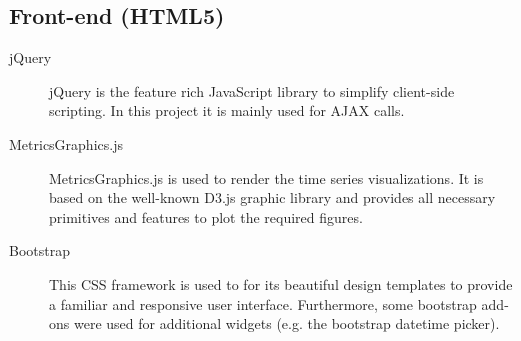\documentclass[11pt, a4paper]{article}
\begin{document}
\subsection{Front-end (HTML5)}

\begin{description}
 \item[jQuery] jQuery is the feature rich JavaScript library to simplify client-side scripting. 
 In this project it is mainly used for AJAX calls.
 \item[MetricsGraphics.js] MetricsGraphics.js is used to render the time series visualizations.
 It is based on the well-known D3.js graphic library and provides all necessary primitives and features to plot the required figures.
 \item[Bootstrap] This CSS framework is used to for its beautiful design templates to provide a familiar and responsive user interface.
 Furthermore, some bootstrap add-ons were used for additional widgets (e.g. the bootstrap datetime picker).
\end{description}
\end{document}
